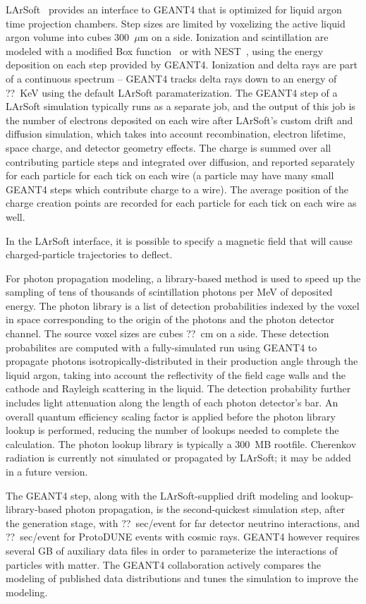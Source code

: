 LArSoft~\cite{larsoft} provides an interface to GEANT4 that is optimized for liquid argon time projection
chambers.  Step sizes are limited by voxelizing the active liquid argon volume into cubes 300~$\mu$m on a side.
Ionization and scintillation are modeled with a modified Box function~\cite{box} or with NEST~\cite{nest}, using
the energy deposition on each step provided by GEANT4.  Ionization and delta rays are part of a continuous
spectrum -- GEANT4 tracks delta rays down to an energy of ??~KeV using the default LArSoft paramaterization.
The GEANT4 step of a LArSoft simulation typically runs as a separate job, and the output of this job is the
number of electrons deposited on each wire after LArSoft's custom drift and diffusion simulation, which
takes into account recombination, electron lifetime, space charge, and detector geometry effects.  The charge
is summed over all contributing particle steps and integrated over diffusion, and reported separately for
each particle for each tick on each wire (a particle may have many small GEANT4 steps which contribute
charge to a wire).  The average position of the charge creation points are recorded for each particle for each
tick on each wire as well.  

In the LArSoft interface,  it is possible to specify a magnetic field that will cause charged-particle
trajectories to deflect.

For photon propagation modeling, a library-based method is used to speed up the sampling of tens of thousands of
scintillation photons per MeV of deposited energy.  The photon library is a list of detection probabilities
indexed by the voxel in space corresponding to the origin of the photons and the photon detector channel.
The source voxel sizes are cubes ??~cm on a side.  These detection probabilites are computed with a fully-simulated
run using GEANT4 to propagate photons isotropically-distributed in their production angle through the liquid argon,
taking into account the reflectivity of the field cage walls and the cathode and Rayleigh scattering in the liquid.
The detection probability further includes light attenuation along the length of each photon detector's bar.  An
overall quantum efficiency scaling factor is applied before the photon library lookup is performed, reducing the
number of lookups needed to complete the calculation.  The photon lookup library is typically a 300~MB rootfile.
Cherenkov radiation is currently not simulated or propagated by LArSoft; it may be added in a future version.

The GEANT4 step, along with the LArSoft-supplied drift modeling and lookup-library-based photon propagation, 
is the second-quickest simulation step,
after the generation stage, with ??~sec/event for far detector neutrino interactions, and ??~sec/event for
ProtoDUNE events with cosmic rays.  GEANT4 however requires several GB of auxiliary data files in order
to parameterize the interactions of particles with matter.  The GEANT4 collaboration actively compares
the modeling of published data distributions and tunes the simulation to improve the modeling.

